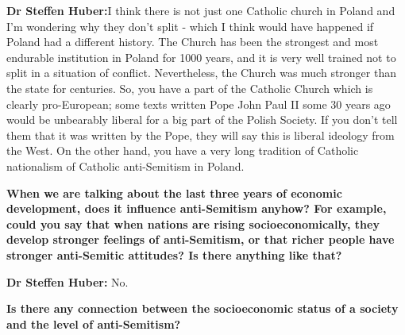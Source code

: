\textbf{Dr Steffen Huber:}I think there is not just one Catholic church in Poland and I'm wondering why they don't split - which I think would have happened if Poland had a different history. The Church has been the strongest and most endurable institution in Poland for 1000 years, and it is very well trained not to split in a situation of conflict. Nevertheless, the Church was much stronger than the state for centuries. So, you have a part of the Catholic Church which is clearly pro-European; some texts written Pope John Paul II some 30 years ago would be unbearably liberal for a big part of the Polish Society. If you don't tell them that it was written by the Pope, they will say this is liberal ideology from the West. On the other hand, you have a very long tradition of Catholic nationalism of Catholic anti-Semitism in Poland. 

\textbf{When we are talking about the last three years of economic development, does it influence anti-Semitism anyhow?  For example, could you say that when nations are rising socioeconomically, they develop stronger feelings of anti-Semitism, or that richer people have stronger anti-Semitic attitudes? Is there anything like that?} 

\textbf{Dr Steffen Huber:} No. 

\textbf{Is there any connection between the socioeconomic status of a society and the level of anti-Semitism?} 

